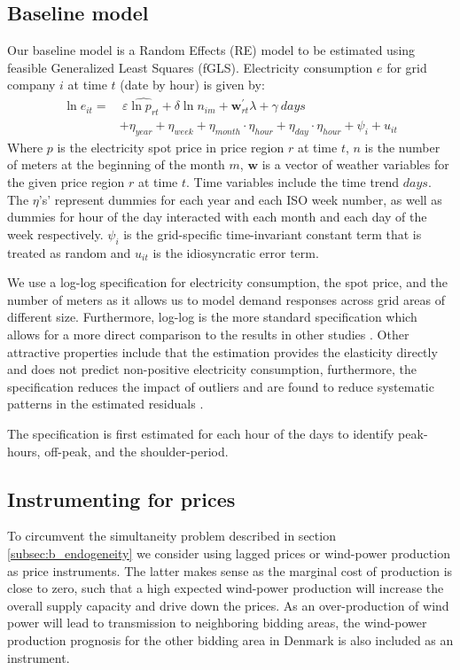 \label{sec:empirical}
\subsection{Baseline model}
\label{subsec:e_model}
Our baseline model is a Random Effects (RE) model to be estimated using feasible Generalized Least Squares (fGLS). Electricity consumption $e$ for grid company $i$ at time $t$ (date by hour) is given by:
\begin{equation}
  \begin{split}
  \ln e_{it}=&\ \varepsilon \hat{\ln p_{rt}}+\delta\ln n_{im}+\bm{w}^{'}_{rt}\lambda+\gamma\ days\\
  &+\eta_{year}+\eta_{week}+\eta_{month}\cdot\eta_{hour}+\eta_{day}\cdot\eta_{hour}+\psi_i+u_{it}
  \end{split}
  \label{eq:baseline}
\end{equation}
Where $p$ is the electricity spot price in price region $r$ at time $t$, $n$ is the number of meters at the beginning of the month $m$, $\bm{w}$ is a vector of weather variables for the given price region $r$ at time $t$. Time variables include the time trend $days$. The $\eta$'s' represent dummies for each year and each ISO week number, as well as dummies for hour of the day interacted with each month and each day of the week respectively. $\psi_i$ is the grid-specific time-invariant constant term that is treated as random and $u_{it}$ is the idiosyncratic error term.
\par
We use a log-log specification for electricity consumption, the spot price, and the number of meters as it allows us to model demand responses across grid areas of different size. Furthermore, log-log is the more standard specification which allows for a more direct comparison to the results in other studies \citep{burke2017price}. Other attractive properties include that the estimation provides the elasticity directly and does not predict non-positive electricity consumption, furthermore, the specification reduces the impact of outliers and are found to reduce systematic patterns in the estimated residuals \citep{burke2017price}.
\par
The specification is first estimated for each hour of the days to identify peak-hours, off-peak, and the shoulder-period.

\subsection{Instrumenting for prices}
\label{subsec:e_instrumenting}
To circumvent the simultaneity problem described in section \ref{subsec:b_endogeneity} we consider using lagged prices or wind-power production as price instruments. The latter makes sense as the marginal cost of production is close to zero, such that a high expected wind-power production will increase the overall supply capacity and drive down the prices. As an over-production of wind power will lead to transmission to neighboring bidding areas, the wind-power production prognosis for the other bidding area in Denmark is also included as an instrument.

